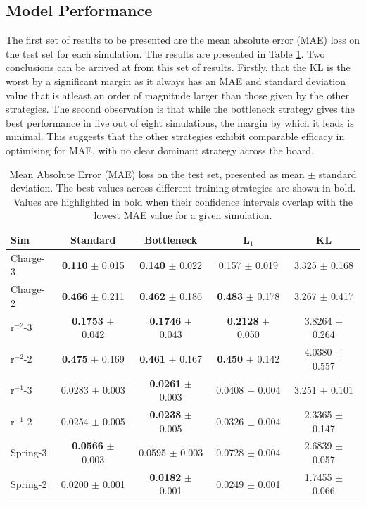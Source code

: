 \documentclass[11pt]{article}
\begin{document}
\subsection{Model Performance}
The first set of results to be presented are the mean absolute error (MAE) loss on the test set for each simulation. The results are presented in Table \ref{tab:mae_table_with_std}. Two conclusions can be arrived at from this set of results. Firstly, that the KL is the worst by a significant margin as it always has an MAE and standard deviation value that is atleast an order of magnitude larger than those given by the other strategies. The second observation is that while the bottleneck strategy gives the best performance in five out of eight simulations, the margin by which it leads is minimal. This suggests that the other strategies exhibit comparable efficacy in optimising for MAE, with no clear dominant strategy across the board.
\begin{table}[H]
    \centering
    \begin{tabular}{lcccc}
    \hline
    Sim & Standard & Bottleneck & L$_1$ & KL \\
    \hline
    Charge-3 & \textbf{0.110} $\pm$ 0.015 & \textbf{0.140} $\pm$ 0.022 & 0.157 $\pm$ 0.019 & 3.325 $\pm$ 0.168 \\
    Charge-2 & \textbf{0.466} $\pm$ 0.211 & \textbf{0.462} $\pm$ 0.186 & \textbf{0.483} $\pm$ 0.178 & 3.267 $\pm$ 0.417 \\
    r$^{-2}$-3 & \textbf{0.1753} $\pm$ 0.042 & \textbf{0.1746} $\pm$ 0.043 & \textbf{0.2128} $\pm$ 0.050 & 3.8264 $\pm$ 0.264 \\
    r$^{-2}$-2 & \textbf{0.475} $\pm$ 0.169 & \textbf{0.461} $\pm$ 0.167 & \textbf{0.450} $\pm$ 0.142 & 4.0380 $\pm$ 0.557 \\
    r$^{-1}$-3 & 0.0283 $\pm$ 0.003 & \textbf{0.0261} $\pm$ 0.003 & 0.0408 $\pm$ 0.004 & 3.251 $\pm$ 0.101 \\
    r$^{-1}$-2 & 0.0254 $\pm$ 0.005 & \textbf{0.0238} $\pm$ 0.005 & 0.0326 $\pm$ 0.004 & 2.3365 $\pm$ 0.147 \\
    Spring-3 & \textbf{0.0566} $\pm$ 0.003 & 0.0595 $\pm$ 0.003 & 0.0728 $\pm$ 0.004 & 2.6839 $\pm$ 0.057 \\
    Spring-2 & 0.0200 $\pm$ 0.001 & \textbf{0.0182} $\pm$ 0.001 & 0.0249 $\pm$ 0.001 & 1.7455 $\pm$ 0.066 \\
    \hline
    \end{tabular}
    \caption{Mean Absolute Error (MAE) loss on the test set, presented as mean $\pm$ standard deviation. The best values across different training strategies are shown in bold. Values are highlighted in bold when their confidence intervals overlap with the lowest MAE value for a given simulation.}
    \label{tab:mae_table_with_std}
    \end{table}
\end{document}
